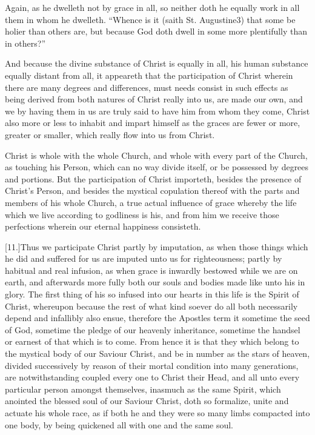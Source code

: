 Again, as he dwelleth not by grace in all, so neither doth he equally work in all them in whom he dwelleth. “Whence is it (saith St. Augustine3) that some be holier than others are, but because God doth dwell in some more plentifully than in others?”

And because the divine substance of Christ is equally in all, his human substance equally distant from all, it appeareth that the participation of Christ wherein there are many degrees and differences, must needs consist in such effects as being derived from both natures of Christ really into us, are made our own, and we by having them in us are truly said to have him from whom they come, Christ also more or less to inhabit and impart himself as the graces are fewer or more, greater or smaller, which really flow into us from Christ.

Christ is whole with the whole Church, and whole with every part of the Church, as touching his Person, which can no way divide itself, or be possessed by degrees and portions. But the participation of Christ importeth, besides the presence of Christ’s Person, and besides the mystical copulation thereof with the parts and members of his whole Church, a true actual influence of grace whereby the life which we live according to godliness is his, and from him we receive those perfections wherein our eternal happiness consisteth.




[11.]Thus we participate Christ partly by imputation, as when those things which he did and suffered for us are imputed unto us for righteousness; partly by habitual and real infusion, as when grace is inwardly bestowed while we are on earth, and afterwards more fully both our souls and bodies made like unto his in glory. The first thing of his so infused into our hearts in this life is the Spirit of Christ, whereupon because the rest of what kind soever do all both necessarily depend and infallibly also ensue, therefore the Apostles term it sometime the seed of God, sometime the pledge of our heavenly inheritance, sometime the handsel or earnest of that which is to come. From hence it is that they which belong to the mystical body of our Saviour Christ, and be in number as the stars of heaven, divided successively by reason of their mortal condition into many generations, are notwithstanding coupled every one to Christ their Head, and all unto every particular person amongst themselves, inasmuch as the same Spirit, which anointed the blessed soul of our Saviour Christ, doth so formalize, unite and actuate his whole race, as if both he and they were so many limbs compacted into one body, by being quickened all with one and the same soul.


